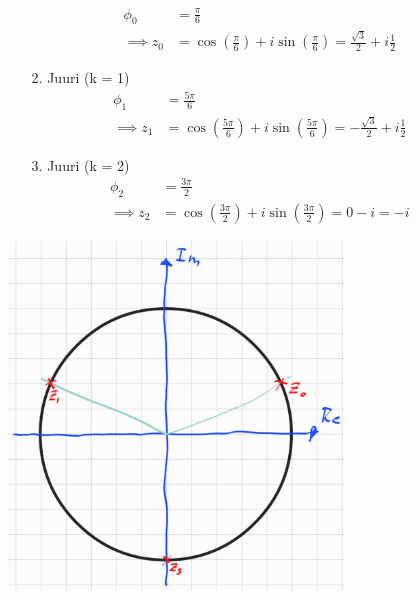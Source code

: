 \documentclass{article}
\begin{document}
\begin{itemize}
\begin{itemize}
\[\begin{aligned}
            \phi_0 &= \frac{\pi}{6}\\
            \implies z_0 &= \cos\left( \frac{\pi}{6} \right) + i \sin\left( \frac{\pi}{6} \right) = \frac{\sqrt{3}}{2} + i \frac{1}{2}
        \end{aligned}
        \]
        \item [2.] Juuri (k = 1)
        \[
        \begin{aligned}
            \phi_1 &= \frac{5\pi}{6}\\
            \implies z_1 &= \cos\left( \frac{5\pi}{6} \right) + i \sin\left( \frac{5\pi}{6} \right) = -\frac{\sqrt{3}}{2} + i \frac{1}{2}
        \end{aligned}
        \]
        \item [3.] Juuri (k = 2)
        \[
        \begin{aligned}
            \phi_2 &= \frac{3\pi}{2}\\
            \implies z_2 &= \cos\left( \frac{3\pi}{2} \right) + i \sin\left( \frac{3\pi}{2} \right) = 0 - i = -i            
        \end{aligned}
        \]
    \end{itemize}
    \begin{center}
        \includegraphics[width=0.7\textwidth]{harj6teht5b.jpg}
    \end{center}


\end{itemize}
\end{document}
